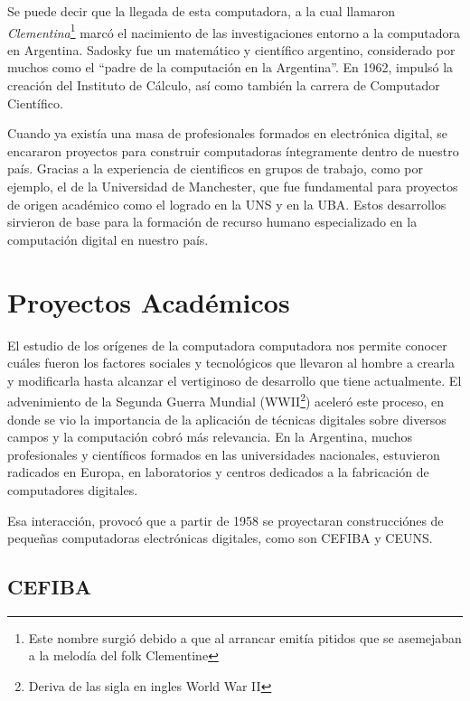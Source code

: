 \documentclass[%
 	final,
%
	notitlepage,
	narroweqnarray,
	inline,
 	twoside,
	]{ieee}
\begin{document}
Se puede decir que la llegada de esta computadora, a la cual llamaron \textit{Clementina}\footnote{Este nombre surgi\'o debido a que al arrancar emit\'ia pitidos que se asemejaban a la melod\'ia del folk Clementine} marc\'o el nacimiento de las investigaciones entorno a la computadora en Argentina.
Sadosky fue un matem\'atico y cient\'ifico argentino, considerado por muchos como el ``padre de la computaci\'on en la Argentina''.
En 1962, impuls\'o la creaci\'on del Instituto de C\'alculo, as\'i como tambi\'en la carrera de Computador Cient\'ifico.

Cuando ya exist\'ia una masa de profesionales formados en electr\'onica digital, se encararon proyectos para construir computadoras \'integramente dentro de nuestro pa\'is. Gracias a la experiencia de cientificos en grupos de trabajo, como por ejemplo, el de la Universidad de Manchester, que fue fundamental para proyectos de origen acad\'emico como el logrado en la UNS y en la UBA. Estos desarrollos sirvieron de base para la formaci\'on de recurso humano especializado en la computaci\'on digital en nuestro pa\'is.

\section{Proyectos Acad\'emicos}

El estudio de los or\'igenes de la computadora computadora nos permite conocer cu\'ales fueron los factores sociales y tecnol\'ogicos que llevaron al hombre a crearla y modificarla hasta alcanzar el vertiginoso de desarrollo que tiene actualmente. El advenimiento de la Segunda Guerra Mundial (WWII\footnote{Deriva de las sigla en ingles World War II}) aceler\'o este proceso, en donde se vio la importancia de la aplicaci\'on de t\'ecnicas digitales sobre diversos campos y la computaci\'on cobr\'o m\'as relevancia. En la Argentina, muchos profesionales y cient\'ificos formados en las universidades nacionales, estuvieron radicados en Europa, en laboratorios y centros dedicados a la fabricaci\'on de computadores digitales. 

Esa interacci\'on, provoc\'o que a partir de 1958 se proyectaran construcci\'ones de peque\~nas computadoras electr\'onicas digitales, como son CEFIBA y CEUNS.

\subsection*{CEFIBA}
\end{document}
